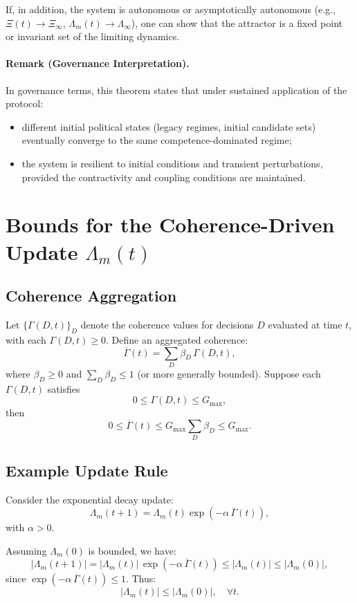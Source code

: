\documentclass[11pt]{article}
\begin{document}
If, in addition, the system is autonomous or asymptotically autonomous (e.g., \(\Xi(t) \to \Xi_\infty\), \(\Lambda_m(t) \to \Lambda_\infty\)), one can show that the attractor is a fixed point or invariant set of the limiting dynamics.

\paragraph{Remark (Governance Interpretation).}
In governance terms, this theorem states that under sustained application of the protocol:
\begin{itemize}
  \item different initial political states (legacy regimes, initial candidate sets) eventually converge to the same competence-dominated regime;
  \item the system is resilient to initial conditions and transient perturbations, provided the contractivity and coupling conditions are maintained.
\end{itemize}

\section{Bounds for the Coherence-Driven Update \texorpdfstring{\(\Lambda_m(t)\)}{Lambda\_m(t)}}

\subsection{Coherence Aggregation}

Let \(\{\Gamma(D,t)\}_D\) denote the coherence values for decisions \(D\) evaluated at time \(t\), with each \(\Gamma(D,t) \geq 0\). Define an aggregated coherence:
\[
  \overline{\Gamma}(t) = \sum_D \beta_D \, \Gamma(D,t),
\]
where \(\beta_D \geq 0\) and \(\sum_D \beta_D \leq 1\) (or more generally bounded). Suppose each \(\Gamma(D,t)\) satisfies
\[
  0 \leq \Gamma(D,t) \leq G_{\max},
\]
then
\[
  0 \leq \overline{\Gamma}(t) \leq G_{\max} \sum_D \beta_D \leq G_{\max}.
\]

\subsection{Example Update Rule}

Consider the exponential decay update:
\[
  \Lambda_m(t+1) = \Lambda_m(t) \exp(-\alpha \, \overline{\Gamma}(t)),
\]
with \(\alpha > 0\).

Assuming \(\Lambda_m(0)\) is bounded, we have:
\[
  |\Lambda_m(t+1)|
  = |\Lambda_m(t)| \, \exp(-\alpha \, \overline{\Gamma}(t))
  \leq |\Lambda_m(t)| \leq |\Lambda_m(0)|,
\]
since \(\exp(-\alpha \, \overline{\Gamma}(t)) \leq 1\). Thus:
\[
  |\Lambda_m(t)| \leq |\Lambda_m(0)|, \quad \forall t.
\]
\end{document}
